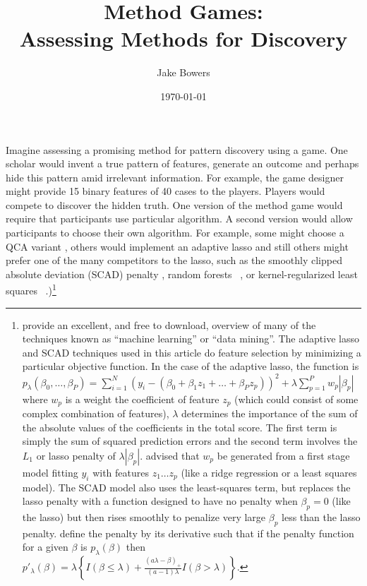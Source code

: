 \documentclass[12pt]{article}
\title{Method Games:\\ Assessing Methods for Discovery}
\author{Jake Bowers}
\date{\today}
\begin{document}
\maketitle

Imagine assessing a promising method for pattern discovery using a game.  One
scholar would invent a true pattern of features, generate an outcome and
perhaps hide this pattern amid irrelevant information.  For example, the game
designer might provide 15 binary features of 40 cases to the players. Players
would compete to discover the hidden truth.  One version of the method game
would require that participants use particular algorithm. A second version
would allow participants to choose their own algorithm. For example, some
might choose a QCA variant \citep{rihoux2008configurational}, others would
implement an adaptive lasso \citep{zou2006adaptive} and still others might
prefer one of the many competitors to the lasso, such as the smoothly clipped
absolute deviation (SCAD) penalty \citep{fan2001variable}, random forests
~\citep{breiman2001random}, or kernel-regularized least squares
~\citep{hainmueller2012kernel}.)\footnote{\citet{hasttibfried09} provide an
  excellent, and free to download, overview of many of the techniques known as
  ``machine learning'' or ``data mining''. The adaptive lasso and SCAD
  techniques used in this article do feature selection by minimizing a
  particular objective function. In the case of the adaptive lasso, the
  function is $p_{\lambda}(\beta_0, \ldots, \beta_P)=\sum_{i=1}^N (y_i - ( \beta_0 + \beta_1 z_1 + \ldots + \beta_P
  z_p) )^2 + \lambda \sum_{p=1}^P w_p|\beta_p|$ where $w_p$ is a weight the
  coefficient of feature $z_p$ (which could consist of some complex
  combination of features), $\lambda$ determines the importance of the sum of
  the absolute values of the coefficients in the total score. The first
  term is simply the sum of squared prediction errors and the second term
  involves the $L_1$ or lasso penalty of $\lambda|\beta_p|$. \citet{zou2006adaptive}
  advised that $w_p$ be generated from a first stage model fitting $y_i$ with
  features $z_1 \ldots z_p$ (like a ridge regression or a least squares
  model). The SCAD model also uses the least-squares term, but replaces the
  lasso penalty with a function designed to have no penalty when $\beta_p=0$
  (like the lasso) but then rises smoothly to penalize very large $\beta_p$ less than the
  lasso penalty. \citet{fan2001variable} define the penalty by its derivative
  such that if the penalty function for a given $\beta$ is $p_\lambda(\beta)$ then
  $p'_{\lambda}(\beta)=\lambda \left\{ I(\beta \le \lambda) + \frac{ (a
      \lambda - \beta)_{+} }{ (a-1) \lambda} I(\beta > \lambda) \right\}$.    
}
\end{document}
